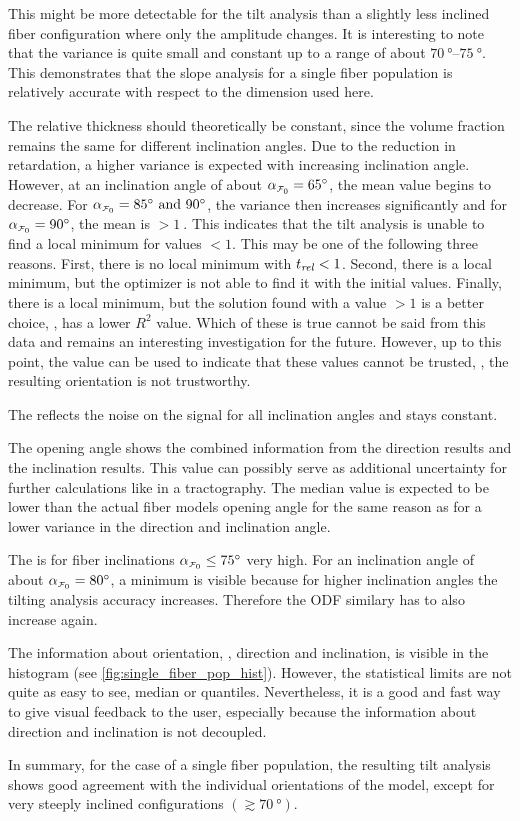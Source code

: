 This might be more detectable for the tilt analysis than a slightly less inclined fiber configuration where only the amplitude changes.
It is interesting to note that the variance is quite small and constant up to a range of about $\SIrange{70}{75}{\degree}$.
This demonstrates that the slope analysis for a single fiber population is relatively accurate with respect to the dimension used here.
\par
%
The relative thickness \trel{} should theoretically be constant, since the volume fraction remains the same for different inclination angles.
Due to the reduction in retardation, a higher variance is expected with increasing inclination angle.
However, at an inclination angle of about $\modelInc=\SI{65}{\degree}$, the mean value begins to decrease.
For $\modelInc=\SIlist{85;90}{\degree}$, the variance then increases significantly and for $\modelInc=\SI{90}{\degree}$, the mean is $>\SI{1}{}$.
This indicates that the tilt analysis is unable to find a local minimum for \trel{} values $<1$.
This may be one of the following three reasons.
First, there is no local minimum with $\textnormal{$t_\mathit{rel}$}<1$.
Second, there is a local minimum, but the optimizer is not able to find it with the initial values.
Finally, there is a local minimum, but the solution found with a \trel{} value $>1$ is a better choice, \ie{}, has a lower $R^2$ value.
Which of these is true cannot be said from this data and remains an interesting investigation for the future.
However, up to this point, the \trel{} value can be used to indicate that these values cannot be trusted, \ie{}, the resulting orientation is not trustworthy.
\par
% 
The \rvalue{} reflects the noise on the signal for all inclination angles and stays constant.
\par
%
The opening angle shows the combined information from the direction results and the inclination results.
This value can possibly serve as additional uncertainty for further calculations like in a tractography.
The median value is expected to be lower than the actual fiber models opening angle for the same reason as for a lower \bvariance{} variance in the direction and inclination angle.
\par
%
The \accvalue{} is for fiber inclinations $\modelInc \leq \SI{75}{\degree}$ very high.
For an inclination angle of about $\modelInc = \SI{80}{\degree}$, a minimum is visible because for higher inclination angles the tilting analysis accuracy increases.
Therefore the \ac{ODF} similary has to also increase again.
\par
% 
The information about orientation, \ie{}, direction and inclination, is visible in the histogram (see \cref*{fig:single_fiber_pop_hist}).
However, the statistical limits are not quite as easy to see, \eg median or quantiles.
Nevertheless, it is a good and fast way to give visual feedback to the user, especially because the information about direction and inclination is not decoupled.
\par
% 
In summary, for the case of a single fiber population, the resulting tilt analysis shows good agreement with the individual orientations of the model, except for very steeply inclined configurations $(\gtrsim \SI{70}{\degree})$.
%
% 
% 
